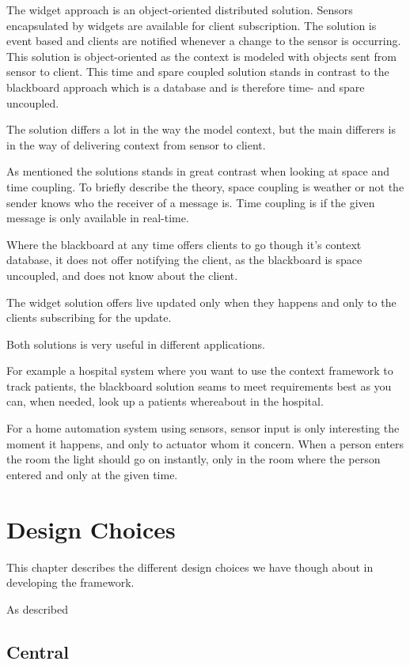 \documentclass[]{report}
\begin{document}
The widget approach is an object-oriented distributed solution. Sensors encapsulated by widgets are available for client subscription. The solution is event based and clients are notified whenever a change to the sensor is occurring. This solution is object-oriented as the context is modeled with objects sent from sensor to client. This time and spare coupled solution stands in contrast to the blackboard approach which is a database and is therefore time- and spare uncoupled.

The solution differs a lot in the way the model context, but the main differers is in the way of delivering context from sensor to client.

As mentioned the solutions stands in great contrast when looking at space and time coupling. To briefly describe the theory, space coupling is weather or not the sender knows who the receiver of a message is. Time coupling is if the given message is only available in real-time. 

Where the blackboard at any time offers clients to go though it's context database, it does not offer notifying the client, as the blackboard is space uncoupled, and does not know about the client.

The widget solution offers live updated only when they happens and only to the clients subscribing for the update.

Both solutions is very useful in different applications.

For example a hospital system where you want to use the context framework to track patients, the blackboard solution seams to meet requirements best as you can, when needed, look up a patients whereabout in the hospital.

For a home automation system using sensors, sensor input is only interesting the moment it happens, and only to actuator whom it concern. When a person enters the room the light should go on instantly, only in the room where the person entered and only at the given time.


  

\chapter{Design Choices}

This chapter describes the different design choices we have though about in developing the framework.

As described 

\section{Central}
\end{document}
